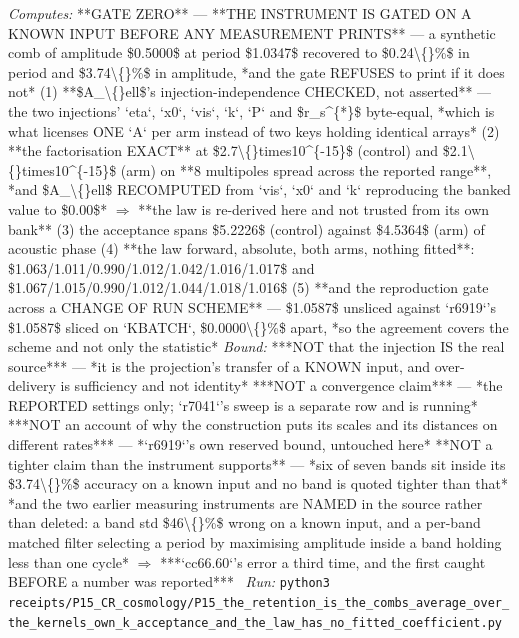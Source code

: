 \begin{description}
\emph{Computes:}  **GATE ZERO** --- **THE INSTRUMENT IS GATED ON A KNOWN INPUT BEFORE ANY MEASUREMENT PRINTS** --- a synthetic comb of amplitude \$0.5000\$ at period \$1.0347\$ recovered to \$0.24\textbackslash\{\}\%\$ in period and \$3.74\textbackslash\{\}\%\$ in amplitude, *and the gate REFUSES to print if it does not*  (1) **\$A\_\textbackslash\{\}ell\$'s injection-independence CHECKED, not asserted** --- the two injections' `eta`, `x0`, `vis`, `k`, `P` and \$r\_s\textasciicircum{}\{*\}\$ byte-equal, *which is what licenses ONE `A` per arm instead of two keys holding identical arrays*  (2) **the factorisation EXACT** at \$2.7\textbackslash\{\}times10\textasciicircum{}\{-15\}\$ (control) and \$2.1\textbackslash\{\}times10\textasciicircum{}\{-15\}\$ (arm) on **8 multipoles spread across the reported range**, *and \$A\_\textbackslash\{\}ell\$ RECOMPUTED from `vis`, `x0` and `k` reproducing the banked value to \$0.00\$* \ensuremath{\Rightarrow} **the law is re-derived here and not trusted from its own bank**  (3) the acceptance spans \$5.2226\$ (control) against \$4.5364\$ (arm) of acoustic phase  (4) **the law forward, absolute, both arms, nothing fitted**: \$1.063/1.011/0.990/1.012/1.042/1.016/1.017\$ and \$1.067/1.015/0.990/1.012/1.044/1.018/1.016\$  (5) **and the reproduction gate across a CHANGE OF RUN SCHEME** --- \$1.0587\$ unsliced against `r6919`'s \$1.0587\$ sliced on `KBATCH`, \$0.0000\textbackslash\{\}\%\$ apart, *so the agreement covers the scheme and not only the statistic*
 \emph{Bound:}  ***NOT that the injection IS the real source*** --- *it is the projection's transfer of a KNOWN input, and over-delivery is sufficiency and not identity*  ***NOT a convergence claim*** --- *the REPORTED settings only; `r7041`'s sweep is a separate row and is running*  ***NOT an account of why the construction puts its scales and its distances on different rates*** --- *`r6919`'s own reserved bound, untouched here*  **NOT a tighter claim than the instrument supports** --- *six of seven bands sit inside its \$3.74\textbackslash\{\}\%\$ accuracy on a known input and no band is quoted tighter than that*  *and the two earlier measuring instruments are NAMED in the source rather than deleted: a band std \$46\textbackslash\{\}\%\$ wrong on a known input, and a per-band matched filter selecting a period by maximising amplitude inside a band holding less than one cycle* \ensuremath{\Rightarrow} ***`cc66.60`'s error a third time, and the first caught BEFORE a number was reported***
\ \emph{Run:} \texttt{python3 receipts/P15\_CR\_cosmology/P15\_the\_retention\_is\_the\_combs\_average\_over\_the\_kernels\_own\_k\_acceptance\_and\_the\_law\_has\_no\_fitted\_coefficient.py}

\end{description}

